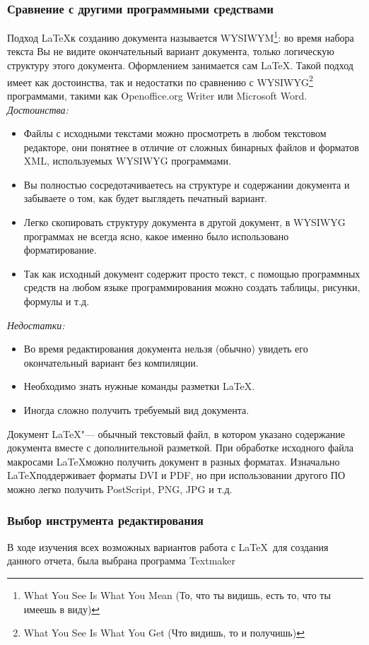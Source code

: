 \documentclass{article}
\begin{document}
		\subsubsection{Сравнение с другими программными средствами}
	Подход \LaTeX к созданию документа называется WYSIWYM\footnote{What You See Is What You Mean (То, что ты видишь, есть то, что ты имеешь в виду)}: во время набора текста Вы не видите окончательный вариант документа, только логическую структуру этого документа. Оформлением занимается сам \LaTeX. Такой подход имеет как достоинства, так и недостатки по сравнению с WYSIWYG\footnote{What You See Is What You Get (Что видишь, то и получишь)} программами, такими как Openoffice.org Writer или Microsoft Word.\\
	\textit{Достоинства:}
	\begin{itemize}
   		\item Файлы с исходными текстами можно просмотреть в любом текстовом редакторе, они понятнее в отличие от сложных бинарных файлов и форматов XML, используемых WYSIWYG программами.
   		\item Вы полностью сосредотачиваетесь на структуре и содержании документа и забываете о том, как будет выглядеть печатный вариант.
   		\item Легко скопировать структуру документа в другой документ, в WYSIWYG программах не всегда ясно, какое именно было использовано форматирование.
   		\item Так как исходный документ содержит просто текст, с помощью программных средств на любом языке программирования можно создать таблицы, рисунки, формулы и т.д.
	\end{itemize}	
	\textit{Недостатки:}
	\begin{itemize}
		\item Во время редактирования документа нельзя (обычно) увидеть его окончательный вариант без компиляции.
   		\item Необходимо знать нужные команды разметки \LaTeX.
   		\item Иногда сложно получить требуемый вид документа.
	\end{itemize}
	Документ \LaTeX "--- обычный текстовый файл, в котором указано содержание документа вместе с дополнительной разметкой. При обработке исходного файла макросами \LaTeX можно получить документ в разных форматах. Изначально \LaTeX поддерживает форматы DVI и PDF, но при использовании другого ПО можно легко получить PostScript, PNG, JPG и т.д.

		\subsubsection{Выбор инструмента редактирования}
			В ходе изучения всех возможных вариантов работа с \LaTeX ~для создания данного отчета, была выбрана программа Textmaker
			
\end{document}
